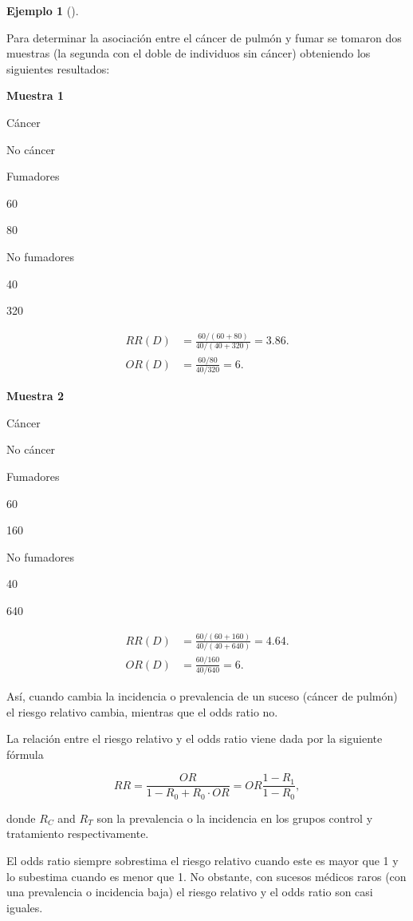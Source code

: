 \documentclass[
  a4paper,
]{scrreport}
\theoremstyle{plain}
\theoremstyle{definition}
\newtheorem{example}{Ejemplo}[chapter]
\theoremstyle{definition}
\theoremstyle{remark}
\begin{document}
\begin{example}[]\protect\hypertarget{exm-riesgo-relativo-vs-odds-ratio}{}\label{exm-riesgo-relativo-vs-odds-ratio}

Para determinar la asociación entre el cáncer de pulmón y fumar se
tomaron dos muestras (la segunda con el doble de individuos sin cáncer)
obteniendo los siguientes resultados:

\textbf{Muestra 1}

Cáncer

No cáncer

Fumadores

60

80

No fumadores

40

320

\begin{align*}
RR(D) &= \frac{60/(60+80)}{40/(40+320)} = 3.86.\\
OR(D) &= \frac{60/80}{40/320} = 6. 
\end{align*}

\textbf{Muestra 2}

Cáncer

No cáncer

Fumadores

60

160

No fumadores

40

640

\begin{align*}
RR(D) &= \frac{60/(60+160)}{40/(40+640)} = 4.64.\\
OR(D) &= \frac{60/160}{40/640} = 6. 
\end{align*}

Así, cuando cambia la incidencia o prevalencia de un suceso (cáncer de
pulmón) el riesgo relativo cambia, mientras que el odds ratio no.

\end{example}

La relación entre el riesgo relativo y el odds ratio viene dada por la
siguiente fórmula

\[RR = \frac{OR}{1-R_0+R_0\cdot OR} = OR \frac{1-R_1}{1-R_0},\]

donde \(R_C\) and \(R_T\) son la prevalencia o la incidencia en los
grupos control y tratamiento respectivamente.

El odds ratio siempre sobrestima el riesgo relativo cuando este es mayor
que 1 y lo subestima cuando es menor que 1. No obstante, con sucesos
médicos raros (con una prevalencia o incidencia baja) el riesgo relativo
y el odds ratio son casi iguales.
\end{document}
